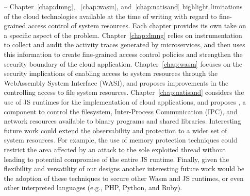  -- Chapter~\ref{chap:dmng},
~\ref{chap:wasm}, and~\ref{chap:natisand} highlight limitations of the
cloud technologies available at the time of writing with regard to
fine-grained access control of system resources. Each chapter provides
its own take on a specific aspect of the problem.
Chapter~\ref{chap:dmng} relies on instrumentation to collect and audit
the activity traces generated by microservices, and then uses this
information to create fine-grained access control policies and
strengthen the security boundary of the cloud application.
Chapter~\ref{chap:wasm} focuses on the security implications of
enabling access to system resources through the WebAssembly System
Interface (WASI), and proposes improvements in the controlling access
to file system resources. Chapter~\ref{chap:natisand} considers the
use of JS runtimes for the implementation of cloud applications, and
proposes \natisand, a component to control the filesystem,
Inter-Process Communication (IPC), and network resources available to
binary programs and shared libraries. Interesting future work could
extend the observability and protection to a wider set of system
resources. For example, the use of memory protection techniques could
restrict the area affected by an attack to the sole exploited thread
without leading to potential compromise of the entire JS runtime.
Finally, given the flexibility and versatility of our designs another
interesting future work would be the adoption of these techniques to
secure other Wasm and JS runtimes, or even other interpreted languages
(e.g., PHP, Python, and Ruby).
